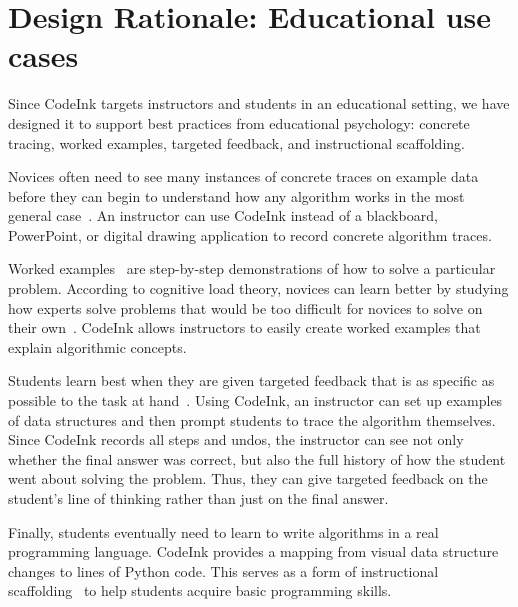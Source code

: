 \section{Design Rationale: Educational use cases}

Since CodeInk targets instructors and students in an educational
setting, we have designed it to support best practices from educational
psychology: concrete tracing, worked examples, targeted feedback, and
instructional scaffolding.

Novices often need to see many instances of concrete traces on example
data before they can begin to understand how any algorithm works in the
most general case~\cite{Vainio2007}. An instructor can use
CodeInk instead of a blackboard, PowerPoint, or digital drawing
application to record concrete algorithm traces.

Worked examples~\cite{Sweller1985} are step-by-step demonstrations of
how to solve a particular problem. According to cognitive load theory,
novices can learn better by studying how experts solve problems that
would be too difficult for novices to solve on their
own~\cite{Linn1992}. CodeInk allows instructors to easily create worked
examples that explain algorithmic concepts.

Students learn best when they are given targeted feedback that is
as specific as possible to the task at hand~\cite{Balzer1989}. Using
CodeInk, an instructor can set up examples of data structures and then
prompt students to trace the algorithm themselves. Since CodeInk records
all steps and undos, the instructor can see not only whether the final
answer was correct, but also the full history of how the student went
about solving the problem. Thus, they can give targeted feedback on the
student's line of thinking rather than just on the final answer.

Finally, students eventually need to learn to write algorithms in a real
programming language. CodeInk provides a mapping from visual data
structure changes to lines of Python code. This serves as a form of
instructional scaffolding~\cite{Pea2004} to help students acquire
basic programming skills.

